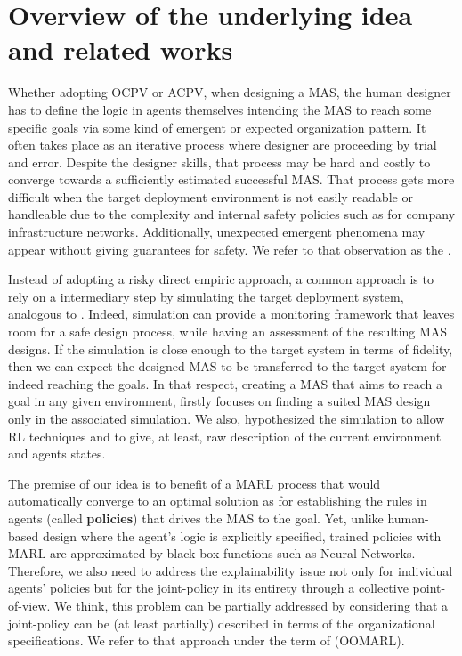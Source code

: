 \documentclass[runningheads]{llncs}
\begin{document}
\section{Overview of the underlying idea and related works}

Whether adopting OCPV or ACPV, when designing a MAS, the human designer has to define the logic in agents themselves intending the MAS to reach some specific goals via some kind of emergent or expected organization pattern. It often takes place as an iterative process where designer are proceeding by trial and error. Despite the designer skills, that process may be hard and costly to converge towards a sufficiently estimated successful MAS. That process gets more difficult when the target deployment environment is not easily readable or handleable due to the complexity and internal safety policies such as for company infrastructure networks. Additionally, unexpected emergent phenomena may appear without giving guarantees for safety. We refer to that observation as the .

Instead of adopting a risky direct empiric approach, a common approach is to rely on a intermediary step by simulating the target deployment system, analogous to . Indeed, simulation can provide a monitoring framework that leaves room for a safe design process, while having an assessment of the resulting MAS designs. If the simulation is close enough to the target system in terms of fidelity, then we can expect the designed MAS to be transferred to the target system for indeed reaching the goals.
In that respect, creating a MAS that aims to reach a goal in any given environment, firstly focuses on finding a suited MAS design only in the associated simulation. We also, hypothesized the simulation to allow RL techniques and to give, at least, raw description of the current environment and agents states.

The premise of our idea is to benefit of a MARL process that would automatically converge to an optimal solution as for establishing the rules in agents (called \textbf{policies}) that drives the MAS to the goal. Yet, unlike human-based design where the agent's logic is explicitly specified, trained policies with MARL are approximated by black box functions such as Neural Networks. Therefore, we also need to address the explainability issue not only for individual agents' policies but for the joint-policy in its entirety through a collective point-of-view. We think, this problem can be partially addressed by considering that a joint-policy can be (at least partially) described in terms of the organizational specifications. We refer to that approach under the term of  (OOMARL).
\end{document}

